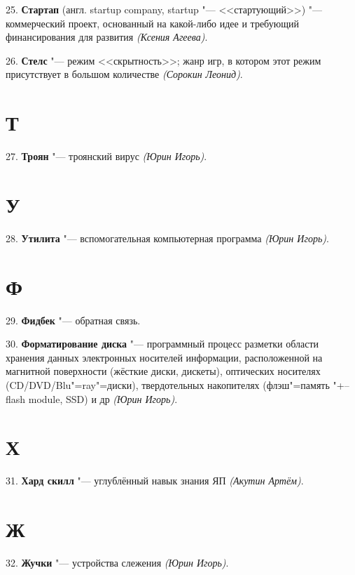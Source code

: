 \documentclass{article}
\begin{document}
25. \textbf{Стартап} (англ. startup company, startup "--- <<стартующий>>) "---
коммерческий проект, основанный на какой-либо идее и требующий финансирования
для развития \textit{(Ксения Агеева)}.

26. \textbf{Стелс} "--- режим <<скрытность>>; жанр игр, в котором этот режим
присутствует в большом количестве \textit{(Сорокин Леонид)}.

\section*{Т}

\hspace{0.37cm} 27. \textbf{Троян} "--- троянский вирус \textit{(Юрин Игорь)}.

\section*{У}

\hspace{0.37cm} 28. \textbf{Утилита} "--- вспомогательная компьютерная программа \textit{(Юрин
Игорь)}.

\section*{Ф}

\hspace{0.4cm} 29. \textbf{Фидбек} "--- обратная связь.

30. \textbf{Форматирование диска} "--- программный процесс разметки области
хранения данных электронных носителей информации, расположенной на магнитной
поверхности (жёсткие диски, дискеты), оптических носителях
(CD/DVD/Blu"=ray"=диски), твердотельных накопителях (флэш"=память "+-- flash
module, SSD) и др \textit{(Юрин Игорь)}.

\section*{Х}

\hspace{0.37cm} 31. \textbf{Хард скилл} "--- углублённый навык знания ЯП \textit{(Акутин
Артём)}.

\section*{Ж}

\hspace{0.37cm} 32. \textbf{Жучки} "--- устройства слежения \textit{(Юрин Игорь)}.
\end{document}
